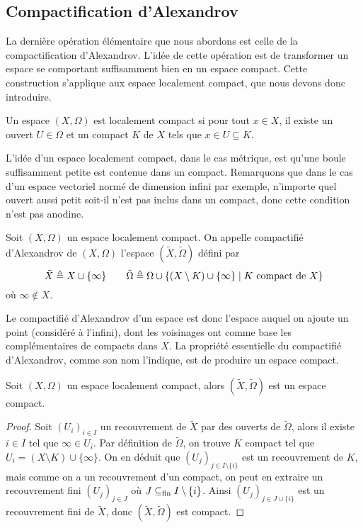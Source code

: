 \subsection{Compactification d'Alexandrov}

La dernière opération élémentaire que nous abordons est celle de la
compactification d'Alexandrov. L'idée de cette opération est de transformer un
espace se comportant suffisamment bien en un espace compact. Cette construction
s'applique aux espace localement compact, que nous devons donc introduire.

\begin{definition}
  Un espace $(X,\Omega)$ est localement compact si pour tout $x\in X$, il existe
  un ouvert $U\in \Omega$ et un compact $K$ de $X$ tels que $x\in U\subseteq K$.
\end{definition}

L'idée d'un espace localement compact, dans le cas métrique, est qu'une boule
suffisamment petite est contenue dans un compact. Remarquons que dans le cas
d'un espace vectoriel normé de dimension infini par exemple, n'importe quel
ouvert aussi petit soit-il n'est pas inclus dans un compact, donc cette
condition n'est pas anodine.

\begin{definition}
  Soit $(X,\Omega)$ un espace localement compact. On appelle compactifié
  d'Alexandrov de $(X,\Omega)$ l'espace $(\tilde X,\tilde\Omega)$ défini par
  \[\tilde X \triangleq X\cup \{\infty\}\qquad
  \tilde\Omega\triangleq \Omega \cup
  \{(X\setminus K) \cup \{\infty\}\mid K \text{ compact de } X\}\]
  où $\infty\notin X$.
\end{definition}

Le compactifié d'Alexandrov d'un espace est donc l'espace auquel on ajoute un
point (considéré à l'infini), dont les voisinages ont comme base les
complémentaires de compacts dans $X$. La propriété essentielle du compactifié
d'Alexandrov, comme son nom l'indique, est de produire un espace compact.

\begin{proposition}
  Soit $(X,\Omega)$ un espace localement compact, alors
  $(\tilde X,\tilde\Omega)$ est un espace compact.
\end{proposition}

\begin{proof}
  Soit $(U_i)_{i\in I}$ un recouvrement de $\tilde X$ par des ouverts de
  $\tilde\Omega$, alors il existe $i\in I$ tel que $\infty \in U_i$. Par
  définition de $\tilde \Omega$, on trouve $K$ compact tel que
  $U_i = (X\setminus K)\cup\{\infty\}$. On en déduit que
  $(U_j)_{j\in I\setminus\{i\}}$ est un recouvrement de $K$, mais comme
  on a un recouvrement d'un compact, on peut en extraire un recouvrement
  fini $(U_j)_{j\in J}$ où $J\subseteq_{\mathrm{fin}} I\setminus\{i\}$. Ainsi
  $(U_j)_{j\in J\cup \{i\}}$ est un recouvrement fini de $\tilde X$, donc
  $(\tilde X,\tilde\Omega)$ est compact.
\end{proof}

